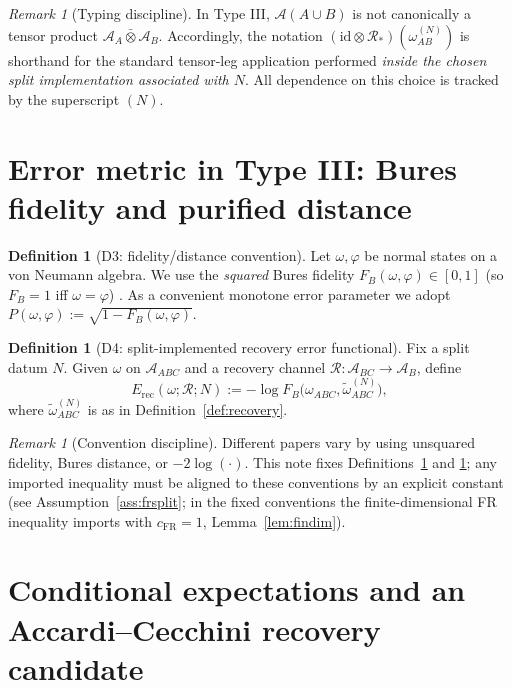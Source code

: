 \documentclass[11pt]{article}
\theoremstyle{definition}
\newtheorem{definition}[theorem]{Definition}
\theoremstyle{remark}
\newtheorem{remark}[theorem]{Remark}
\newcommand{\Erec}{E_{\mathrm{rec}}}
\newcommand{\cA}{\mathcal{A}}
\newcommand{\cR}{\mathcal{R}}
\begin{document}
\begin{remark}[Typing discipline]
\label{rem:discipline}
In Type III, $\cA(A \cup B)$ is not canonically a tensor product $\cA_A
\bar{\otimes} \cA_B$. Accordingly, the notation $(\mathrm{id} \otimes
\cR_*)(\omega^{(N)}_{AB})$ is shorthand for the standard tensor-leg
application performed \emph{inside the chosen split implementation
associated with $N$}. All dependence on this choice is tracked by the
superscript $(N)$.
\end{remark}

\section{Error metric in Type III: Bures fidelity and purified distance}

\begin{definition}[D3: fidelity/distance convention]
\label{def:fidelity}
Let $\omega, \varphi$ be normal states on a von Neumann algebra. We use
the \emph{squared} Bures fidelity $F_B(\omega, \varphi) \in [0,1]$ (so
$F_B = 1$ iff $\omega = \varphi$) \cite{Uhlmann}. As a convenient
monotone error parameter we adopt $P(\omega, \varphi) := \sqrt{1 -
F_B(\omega, \varphi)}$.
\end{definition}

\begin{definition}[D4: split-implemented recovery error functional]
\label{def:erec}
Fix a split datum $N$. Given $\omega$ on $\cA_{ABC}$ and a recovery
channel $\cR: \cA_{BC} \to \cA_B$, define
\[
\Erec(\omega; \cR; N) := -\log F_B\bigl(\omega_{ABC},
\widetilde{\omega}^{(N)}_{ABC}\bigr),
\]
where $\widetilde{\omega}^{(N)}_{ABC}$ is as in
Definition~\ref{def:recovery}.
\end{definition}

\begin{remark}[Convention discipline]
\label{rem:convention}
Different papers vary by using unsquared fidelity, Bures distance, or
$-2\log(\cdot)$. This note fixes Definitions~\ref{def:fidelity} and
\ref{def:erec}; any imported inequality must be aligned to these
conventions by an explicit constant (see Assumption~\ref{ass:frsplit};
in the fixed conventions the finite-dimensional FR inequality imports
with $c_{\mathrm{FR}} = 1$, Lemma~\ref{lem:findim}).
\end{remark}

\section{Conditional expectations and an Accardi--Cecchini recovery
candidate}
\end{document}
